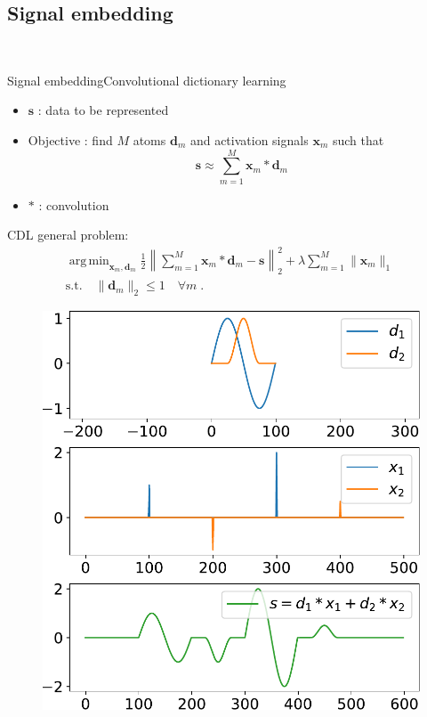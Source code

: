 \documentclass[9pt,t,aspectratio=1610]{beamer}
\newcommand{\bfx}{\mathbf{x}}
\newcommand{\bfs}{\mathbf{s}}
\newcommand{\bfd}{\mathbf{d}}
\DeclareMathOperator*{\argmin}{arg\,min}
\begin{document}
\subsection{Signal embedding}

\begin{frame}[noframenumbering]{\ }
\hfill
\parbox[t]{.85\textwidth}{
  \begin{minipage}[c][0.65\textheight]{\textwidth}
  \tableofcontents[currentsection, subsectionstyle=show/shaded/shaded]
  \end{minipage}
}
\end{frame}


\begin{frame}{Signal embedding}{Convolutional dictionary learning}
\begin{minipage}[t]{0.45\linewidth}
    \begin{itemize}
        \item $\bfs$ : data to be represented
        \item Objective : find $M$ atoms $\bfd_m$ and activation signals $\bfx_m$ such that
        $$\bfs \approx \sum_{m=1}^{M}\bfx_m * \bfd_m$$
        \item $*$ : convolution
    \end{itemize}
    \pause[3]
    CDL general problem:
    \begin{gather*}\label{eq:cdl_baseform}
    \argmin_{\bfx_m,\bfd_m} \frac{1}{2} \left\| \sum_{m=1}^{M} \bfx_{m} * \bfd_m - \bfs \right\|_2^2 + \lambda \sum_{m=1}^{M} \|\bfx_m \|_1 \ \\
        \text{s.t.}\quad \| \bfd_m\|_2 \leq 1 \quad \forall m \;. \nonumber
    \end{gather*}
\end{minipage}\hfill
\begin{minipage}[t]{0.4\linewidth}
    \centering
    \pause[2]
    \begin{figure}[h]
        \centering
        \includegraphics[width=0.9\linewidth]{cdl_example_2.pdf}\\

\end{figure}
\end{minipage}
\end{frame}
\end{document}
